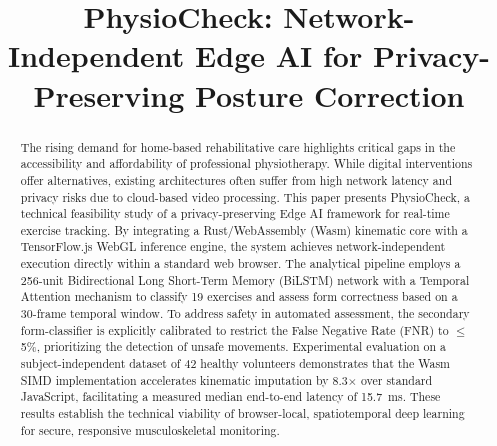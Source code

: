 \documentclass[conference]{IEEEtran}
\begin{document}
\title{PhysioCheck: Network-Independent Edge AI for Privacy-Preserving Posture Correction}

\author{
  \and
  \and
  \and
  \and
}

\maketitle

\begin{abstract}
The rising demand for home-based rehabilitative care highlights critical gaps in the accessibility and affordability of professional physiotherapy. While digital interventions offer alternatives, existing architectures often suffer from high network latency and privacy risks due to cloud-based video processing. This paper presents PhysioCheck, a technical feasibility study of a privacy-preserving Edge AI framework for real-time exercise tracking. By integrating a Rust/WebAssembly (Wasm) kinematic core with a TensorFlow.js WebGL inference engine, the system achieves network-independent execution directly within a standard web browser. The analytical pipeline employs a 256-unit Bidirectional Long Short-Term Memory (BiLSTM) network with a Temporal Attention mechanism to classify 19 exercises and assess form correctness based on a 30-frame temporal window. To address safety in automated assessment, the secondary form-classifier is explicitly calibrated to restrict the False Negative Rate (FNR) to $\leq$ 5\%, prioritizing the detection of unsafe movements. Experimental evaluation on a subject-independent dataset of 42 healthy volunteers demonstrates that the Wasm SIMD implementation accelerates kinematic imputation by 8.3$\times$ over standard JavaScript, facilitating a measured median end-to-end latency of 15.7~ms. These results establish the technical viability of browser-local, spatiotemporal deep learning for secure, responsive musculoskeletal monitoring.
\end{abstract}
\end{document}
